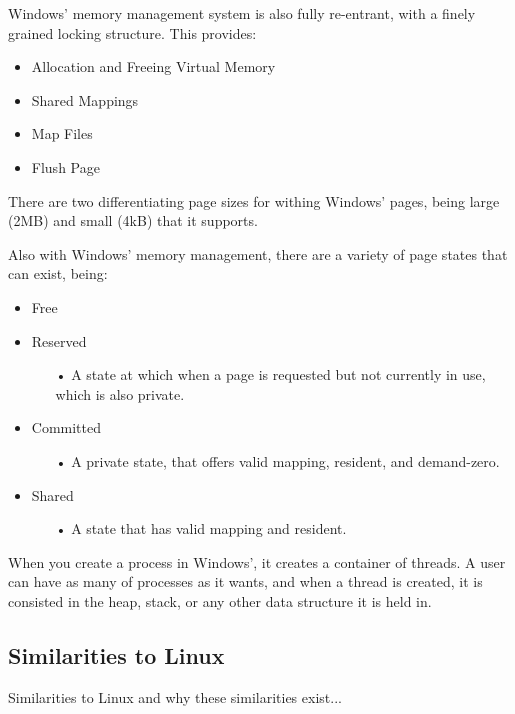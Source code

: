 \documentclass[letterpaper,10pt,onecolumn]{IEEEtran}
\begin{document}
\par
Windows' memory management system is also fully re-entrant, with a finely grained locking structure. This provides:
\begin{itemize}
	\item Allocation and Freeing Virtual Memory
	\item Shared Mappings
	\item Map Files
	\item Flush Page
\end{itemize}

\par
There are two differentiating page sizes for withing Windows' pages, being large (2MB) and small (4kB) that it supports.

\par
Also with Windows' memory management, there are a variety of page states that can exist, being:
\begin{itemize}
	\item Free
	\item Reserved
		\begin{itemize}
			\item[•] A state at which when a page is requested but not currently in use, which is also private.
		\end{itemize}
	\item Committed
		\begin{itemize}
			\item[•] A private state, that offers valid mapping, resident, and demand-zero.
		\end{itemize}
	\item Shared
		\begin{itemize}
			\item[•] A state that has valid mapping and resident.
		\end{itemize}
\end{itemize}

\par
When you create a process in Windows', it creates a container of threads. A user can have as many of processes as it wants, and when a thread is created, it is consisted in the heap, stack, or any other data structure it is held in.

	\subsection*{Similarities to Linux}
	Similarities to Linux and why these similarities exist...
\end{document}
